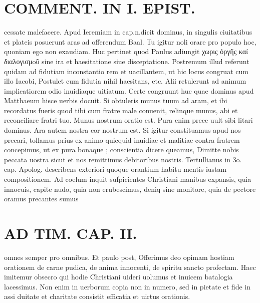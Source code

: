 \documentclass{article}
\begin{document}
\begin{pages}
\section*{COMMENT. IN I. EPIST. }\pstart cessate malefacere. Apud Ieremiam in cap.n.dicit dominus, in singulis ciuitatibus et plateis posuerunt aras ad offerendum Baal. Tu igitur noli orare pro populo hoc, quoniam ego non exaudiam. Huc pertinet quod Paulus adiungit χωρις ὀργῆς καί διαλογισμoῦ sine ira et haesitatione siue disceptatione. Postremum illud referunt quidam ad fidutiam inconstantio rem et uacillantem, ut hic locus congruat cum illo Iacobi, Postulet cum fidutia nihil haesitans, etc. Alii retulerunt ad animum implicatiorem odio inuidiaque uitiatum. Certe congruunt huc quae dominus apud Matthaeum hisce uerbis docuit. Si obtuleris munus tuum ad aram, et ibi recordatus fueris quod tibi cum fratre male conuenit, relinque munus, abi et reconciliare fratri tuo. Munus nostrum oratio est. Pura enim prece uult sibi litari dominus. Ara autem nostra cor nostrum est. Si igitur constituamus apud nos precari, tollamus prius ex animo quicquid inuidiae et malitiae contra fratrem concepimus, ut ex pura bonaque ; conscientia dicere queamus, Dimitte nobis peccata uostra sicut et nos remittimus debitoribus nostris. Tertullianus in 3o. cap. Apolog. describens exteriori quoque orantium habitu mentis iustam compositionem. Ad coelum inquit sufpicientes Christiani manibus expansis, quia innocuis, capite nudo, quia non erubescimus, deniq sine monitore, quia de pectore oramus precantes sumus  \pend
\section*{AD TIM. CAP. II. }
\marginpar{[ p.120 ]}\pstart omnes semper pro omnibus. Et paulo post, Offerimus deo opimam hostiam orationem de carne pudica, de anima innocenti, de spiritu sancto profectam. Haec imitemur obsecro qui hodie Christiani uideri uolumus et inuicem batalogia lacessimus. Non enim in uerborum copia non in numero, sed in pietate et fide in assi duitate et charitate consistit efficatia et uirtus orationis.  \pend
{}
{}

\end{pages}
\end{document}
